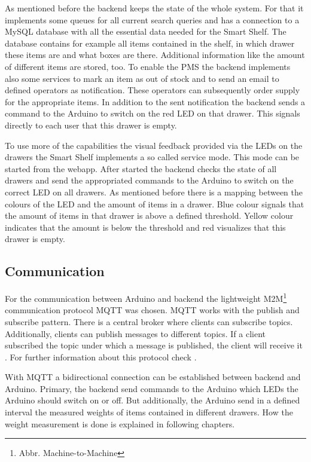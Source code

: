 As mentioned before the backend keeps the state of the whole system. 
For that it implements some queues for all current search queries and has a connection to a MySQL database with all the essential data needed for the Smart Shelf. 
The database contains for example all items contained in the shelf, in which drawer these items are and what boxes are there. 
Additional information like the amount of different items are stored, too. 
To enable the PMS the backend implements also some services to mark an item as out of stock and to send an email to defined operators as notification. 
These operators can subsequently order supply for the appropriate items. 
In addition to the sent notification the backend sends a command to the Arduino to switch on the red LED on that drawer. 
This signals directly to each user that this drawer is empty. 

To use more of the capabilities the visual feedback provided via the LEDs on the drawers the Smart Shelf implements a so called service mode. 
This mode can be started from the webapp. 
After started the backend checks the state of all drawers and send the appropriated commands to the Arduino to switch on the correct LED on all drawers. 
As mentioned before there is a mapping between the colours of the LED and the amount of items in a drawer. 
Blue colour signals that the amount of items in that drawer is above a defined threshold. 
Yellow colour indicates that the amount is below the threshold and red visualizes that this drawer is empty. 

\subsection{Communication}\label{sec:communciation}
For the communication between Arduino and backend the lightweight M2M\footnote{Abbr. Machine-to-Machine} communication protocol MQTT was chosen. 
MQTT works with the publish and subscribe pattern. 
There is a central broker where clients can subscribe topics. 
Additionally, clients can publish messages to different topics. 
If a client subscribed the topic under which a message is published, the client will receive it \cite{standard2014mqtt}. 
For further information about this protocol check \cite{standard2014mqtt}. 

With MQTT a bidirectional connection can be established between backend and Arduino. 
Primary, the backend send commands to the Arduino which LEDs the Arduino should switch on or off. 
But additionally, the Arduino send in a defined interval the measured weights of items contained in different drawers. 
How the weight measurement is done is explained in following chapters. 
